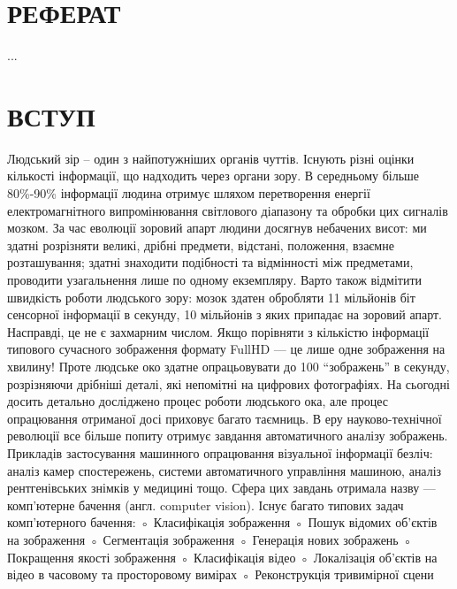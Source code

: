 \documentclass[a4paper,12pt,titlepage]{article}
\begin{document}
\setcounter{page}{2}
\pagestyle{myheadings}
\renewcommand{\headrulewidth}{0 pt}

\newpage
\tableofcontents
\newpage
	

        
\newpage
\section*{\centering РЕФЕРАТ}
...

\newpage
\section*{\centering ВСТУП}	



Людський зір – один з найпотужніших органів чуттів. Існують різні оцінки кількості інформації, що надходить через органи зору. В середньому більше 80\%-90\% інформації людина отримує шляхом перетворення енергії електромагнітного випромінювання світлового діапазону та обробки цих сигналів мозком. За час еволюції зоровий апарт людини досягнув небачених висот: ми здатні розрізняти великі, дрібні предмети, відстані, положення, взаємне розташування; здатні знаходити подібності та відмінності між предметами, проводити узагальнення лише по одному екземпляру. Варто також відмітити швидкість роботи людського зору: мозок здатен обробляти 11 мільйонів біт сенсорної інформації в секунду, 10 мільйонів з яких припадає на зоровий апарт. Насправді, це не є захмарним числом. Якщо порівняти з кількістю інформації типового сучасного зображення формату FullHD — це лише одне зображення на хвилину! Проте людське око здатне опрацьовувати до 100 “зображень” в секунду, розрізняючи дрібніші деталі, які непомітні на цифрових фотографіях. На сьогодні досить детально досліджено процес роботи людського ока, але процес опрацювання отриманої досі приховує багато таємниць. В еру науково-технічної революції все більше попиту отримує завдання автоматичного аналізу зображень. Прикладів застосування машинного опрацювання візуальної інформації безліч: аналіз камер спостережень, системи автоматичного управління машиною, аналіз рентгенівських знімків у медицині тощо. Сфера цих завдань отримала назву — комп’ютерне бачення (англ. computer vision). Існує багато типових задач комп’ютерного бачення:
        ◦ Класифікація зображення
        ◦ Пошук відомих об’єктів на зображення
        ◦ Сегментація зображення
        ◦ Генерація нових зображень
        ◦ Покращення якості зображення
        ◦ Класифікація відео
        ◦ Локалізація об’єктів на відео в часовому та просторовому вимірах
        ◦ Реконструкція тривимірної сцени
\end{document}
